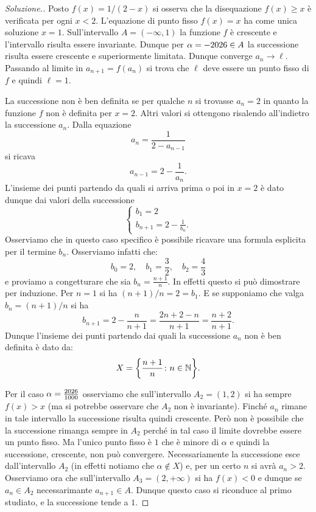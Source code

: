 \begin{proof}[Soluzione.]
Posto $f(x) = 1/(2-x)$
si osserva che la disequazione $f(x)\ge x$ è verificata per ogni
$x<2$. L'equazione di punto fisso $f(x)=x$ ha come unica soluzione
$x=1$. Sull'intervallo $A=(-\infty,1)$ la funzione $f$ è crescente e
l'intervallo risulta essere invariante. Dunque per
$\alpha=-\the\year \in A$ la successione risulta essere crescente e superiormente
limitata. Dunque converge $a_n\to \ell$. Passando al limite in
$a_{n+1} = f(a_n)$ si trova che $\ell$ deve essere un punto fisso di
$f$ e quindi $\ell = 1$.

La successione non è ben definita se per qualche $n$ si trovasse
$a_n=2$ in quanto la funzione $f$ non è definita per $x=2$. Altri
valori si ottengono risalendo all'indietro la successione $a_n$.
Dalla equazione
\[
a_n = \frac{1}{2-a_{n-1}}
\]
si ricava
\[
a_{n-1} = 2-\frac{1}{a_n}.
\]
L'insieme dei punti partendo da quali si arriva prima o poi in $x=2$ è
dato dunque dai valori della successione
\[
\begin{cases}
  b_1 = 2\\
  b_{n+1} = 2 - \frac{1}{b_n}.
\end{cases}
\]
Osserviamo che in questo caso specifico è possibile ricavare una
formula esplicita per il termine $b_n$. Osserviamo infatti che:
\[
b_0 = 2,\quad
b_1 = \frac{3}{2},\quad
b_2 = \frac{4}{3}
\]
e proviamo a congetturare che sia $b_n = \frac{n+1} n$. In effetti questo
si può dimostrare per induzione. Per $n=1$ si ha $(n+1)/n = 2 =
b_1$. E se supponiamo che valga $b_n = (n+1)/n$ si ha
\[
b_{n+1} = 2 - \frac{n}{n+1} = \frac{2n+2-n}{n+1} = \frac{n+2}{n+1}.
\]
Dunque l'insieme dei punti partendo dai quali la successione $a_n$ non
è ben definita è dato da:
\[
  X= {\left\{ \frac{n+1}{n}\colon n \in \mathbb N \right\}}.
\]

Per il caso $\alpha=\frac{\the\year}{1000}$ osserviamo che sull'intervallo
$A_2 = (1,2)$ si ha sempre $f(x)>x$ (ma si potrebbe osservare che
$A_2$ non è invariante). Finché $a_n$ rimane in
tale intervallo la successione risulta quindi crescente. Però non è
possibile che la successione rimanga sempre in $A_2$ perché in tal
caso il limite dovrebbe essere un punto
fisso. Ma l'unico punto fisso è $1$ che è minore di $\alpha$ e quindi
la successione, crescente, non può convergere. Necessariamente la
successione esce dall'intervallo $A_2$ (in effetti notiamo che $\alpha
\not \in X$) e, per un certo $n$ si avrà $a_n>2$. Osserviamo ora che
sull'intervallo $A_3 = (2,+\infty)$ si ha $f(x)<0$ e dunque
se $a_n\in A_2$ necessarimante $a_{n+1} \in A$. Dunque questo caso si
riconduce al primo studiato, e la successione tende a $1$.
\end{proof}


